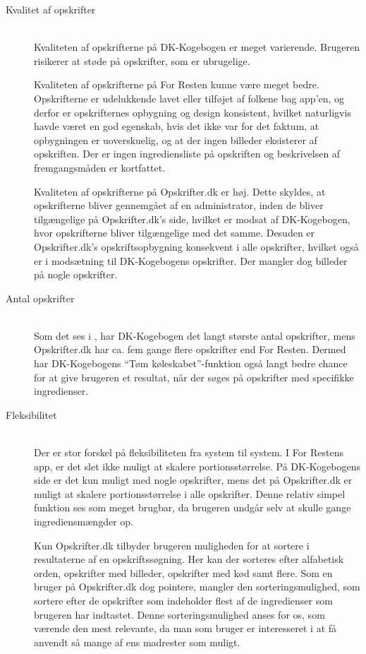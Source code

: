 \begin{description}
\item[Kvalitet af opskrifter] \hfill \\
Kvaliteten af opskrifterne på DK-Kogebogen er meget varierende. Brugeren risikerer at støde på opskrifter, som er ubrugelige. 

Kvaliteten af opskrifterne på For Resten kunne være meget bedre. Opskrifterne er udelukkende lavet eller tilføjet af folkene bag app’en, og derfor er opskrifternes opbygning og design konsistent, hvilket naturligvis havde været en god egenskab, hvis det ikke var for det faktum, at opbygningen er uoverskuelig, og at der ingen billeder eksisterer af opskriften. Der er ingen ingrediensliste på opskriften og beskrivelsen af fremgangsmåden er kortfattet. 

Kvaliteten af opskrifterne på Opskrifter.dk er høj. Dette skyldes, at opskrifterne bliver gennemgået af en administrator, inden de bliver tilgængelige på Opskrifter.dk’s side, hvilket er modsat af DK-Kogebogen, hvor opskrifterne bliver tilgængelige med det samme. Desuden er Opskrifter.dk’s opskriftsopbygning konsekvent i alle opskrifter, hvilket også er i modsætning til DK-Kogebogens opskrifter. Der mangler dog billeder på nogle opskrifter.

\item[Antal opskrifter] \hfill \\
Som det ses i , har DK-Kogebogen det langt største antal opskrifter, mens Opskrifter.dk har ca. fem gange flere opskrifter end For Resten. Dermed har DK-Kogebogens ``Tøm køleskabet''-funktion også langt bedre chance for at give brugeren et resultat, når der søges på opskrifter med specifikke ingredienser.

\item[Fleksibilitet] \hfill \\
Der er stor forskel på fleksibiliteten fra system til system. I For Restens app, er det slet ikke muligt at skalere portionsstørrelse. På DK-Kogebogens side er det kun muligt med nogle opskrifter, mens det på Opskrifter.dk er muligt at skalere portionsstørrelse i alle opskrifter. Denne relativ simpel funktion ses som meget brugbar, da brugeren undgår selv at skulle gange ingrediensmængder op.

Kun Opskrifter.dk tilbyder brugeren muligheden for at sortere i resultaterne af en opskriftssøgning. Her kan der sorteres efter alfabetisk orden, opskrifter med billeder, opskrifter med kød samt flere. Som en bruger på Opskrifter.dk dog pointere, mangler den sorteringsmulighed, som sortere efter de opskrifter som indeholder flest af de ingredienser som brugeren har indtastet. Denne sorteringsmulighed anses for os, som værende den mest relevante, da man som bruger er interesseret i at få anvendt så mange af ens madrester som muligt.


\end{description}

